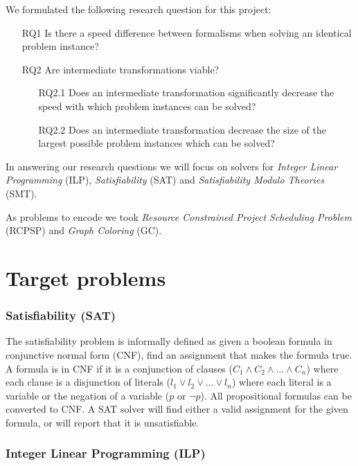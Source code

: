 \documentclass{sig-alternate}
\begin{document}
We formulated the following research question for this project:

\begin{enumerate}
\item[RQ1]{Is there a speed difference between formalisms when solving an identical problem instance?}
\item[RQ2]{Are intermediate transformations viable?}
	\begin{enumerate}
	\item[RQ2.1]{Does an intermediate transformation significantly decrease the speed with which problem instances can be solved?}
	\item[RQ2.2]{Does an intermediate transformation decrease the size of the largest possible problem instances which can be solved?}
	\end{enumerate}
\end{enumerate}

In answering our research questions we will focus on solvers for \emph{Integer Linear Programming} (ILP), \emph{Satisfiability} (SAT) and \emph{Satisfiability Modulo Theories} (SMT).

As problems to encode we took \emph{Resource Constrained Project Scheduling Problem} (RCPSP) and \emph{Graph Coloring} (GC).

\section {Target problems}

\subsubsection*{Satisfiability (SAT)}

The satisfiability problem is informally defined as given a boolean formula in conjunctive normal form (CNF), find an assignment that makes the formula true. A formula is in CNF if it is a conjunction of clauses ($C_1 \wedge C_2 \wedge \ldots \wedge C_n$) where each clause is a disjunction of literals ($l_1 \lor l_2 \lor \ldots \lor l_n$) where each literal is a variable or the negation of a variable ($p$ or $\neg p$). All propositional formulas can be converted to CNF.
A SAT solver will find either a valid assignment for the given formula, or will report that it is unsatisfiable.

\subsubsection*{Integer Linear Programming (ILP)}
\end{document}
